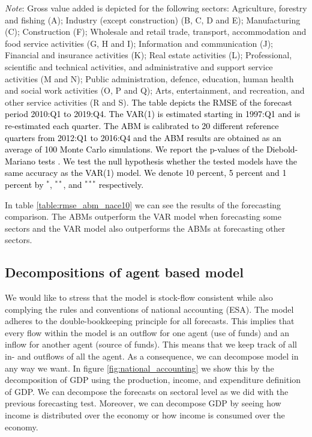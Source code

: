 {\begin{table}[!h]
{\begin{tabular}{lllllllllll}
			\\ \bottomrule
		\end{tabular}
	}
	\begin{tablenotes}
		\footnotesize \item \textit{Note}: Gross value added is depicted for the following sectors: Agriculture, forestry and fishing (A); Industry (except construction) (B, C, D and E); Manufacturing (C); Construction (F); Wholesale and retail trade, transport, accommodation and food service activities (G, H and I); Information and communication (J); Financial and insurance activities (K); Real estate activities (L); Professional, scientific and technical activities, and administrative and support service activities (M and N); Public administration, defence, education, human health and social work activities (O, P and Q); Arts, entertainment, and recreation, and other service activities (R and S). \textcolor{black}{The table depicts the RMSE of the forecast period 2010:Q1 to 201\textcolor{black}{9}:Q4. The VAR(1) is estimated starting in 1997:Q1 and is re-estimated each quarter. The ABM is calibrated to \textcolor{black}{20} different reference quarters from 2012:Q1 to \textcolor{black}{2016:Q4} and the ABM results are obtained as an average of 100 Monte Carlo simulations. We report the p-values of the Diebold-Mariano tests \citep{harveyTestingEqualityPrediction1997}.  We test the null hypothesis whether the tested models have the same accuracy as the VAR(1) model. We denote  10 percent, 5 percent and 1 percent by $^{*}$, $^{**}$, and $^{***}$ respectively.}
	\end{tablenotes}
\end{table}
In table \ref{table:rmse_abm_nace10} we can see the results of the forecasting comparison. The ABMs outperform the VAR model when forecasting some sectors and the VAR model also outperforms the ABMs at forecasting other sectors. 
\subsection{Decompositions of agent based model}
 We would like to stress that the model is stock-flow consistent while also complying the rules and conventions of national accounting (ESA). The model adheres to the double-bookkeeping principle for all forecasts. This implies that every flow within the model is an outflow for one agent (use of funds) and an inflow for another agent (source of funds). This means that we keep track of all in- and outflows of all the agent. As a consequence, we can decompose model in any way we want. In figure \ref{fig:national_accounting} we show this by the decomposition of GDP using the production, income, and expenditure definition of GDP. We can decompose the forecasts on sectoral level as we did with the previous forecasting test. Moreover, we can decompose GDP by seeing how income is distributed over the economy or how income is consumed over the economy.

}
